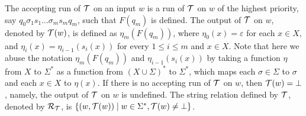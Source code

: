 \begin{definition}
The accepting run of $\mathcal{T}$ on an input $w$ is a run of $\mathcal{T}$ on $w$ of the highest priority, say $q_0 \sigma_1 s_1 \ldots \sigma_m s_m q_m$, such that $F(q_m)$ is defined. The output of $\mathcal{T}$ on $w$, denoted by $\mathcal{T}(w)$, is defined as $\eta_m(F(q_m))$, where $\eta_0(x) = \varepsilon$ for each $x \in X$, and $\eta_{i}(x) = \eta_{i-1}(s_{i}(x))$ for every $1 \le i \le m$ and $x \in X$. Note that here we abuse the notation  $\eta_m(F(q_m))$ and $\eta_{i-1}(s_{i}(x))$ by taking a function $\eta$ from $X$ to $\Sigma^*$ as a function from $(X \cup \Sigma)^*$ to $\Sigma^*$, which maps each $\sigma \in \Sigma$ to $\sigma$ and each $x \in X$ to $\eta(x)$. If there is no accepting run of $\mathcal{T}$ on $w$, then $\mathcal{T}(w) = \bot$, namely, the output of $\mathcal{T}$ on $w$ is undefined. The string relation defined by $\mathcal{T}$, denoted by $\mathcal{R}_{\mathcal{T}}$,  is $\{(w, \mathcal{T}(w)) \mid w \in \Sigma^\ast, \mathcal{T}(w) \neq \bot\}$.
\end{definition}

